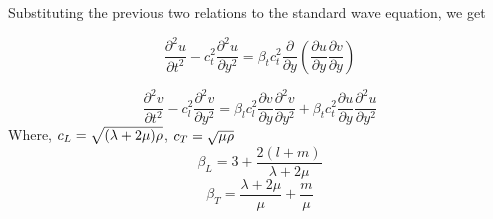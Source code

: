 Substituting the previous two relations to the standard wave equation, we get

\begin{equation}
\frac{ \partial^2 u }{\partial t^2} - c_t^2 \frac{\partial^2 u}{\partial y^2} = \beta_t c_t^2 \frac{\partial}{\partial y}(\frac{\partial u}{\partial y} \frac{\partial v}{\partial y})
\end{equation}

\begin{equation}
\frac{ \partial^2 v }{\partial t^2} - c_l^2 \frac{\partial^2 v}{\partial y^2} = \beta_l c_l^2 \frac{\partial v}{\partial y}\frac{\partial^2 v}{\partial y^2} + \beta_t c_t^2 \frac{\partial u}{\partial y}\frac{\partial^2 u}{\partial y^2}
\end{equation}
Where, $c_L = \sqrt{(\lambda + 2\mu)\\\rho}$, $c_T = \sqrt{\mu \\\rho}$
\begin{equation}
\beta_L = 3 + \frac{2(l + m)}{\lambda + 2\mu}
\end{equation}
\begin{equation}
\beta_T = \frac{\lambda + 2\mu}{\mu} + \frac{m}{\mu}
\end{equation}

